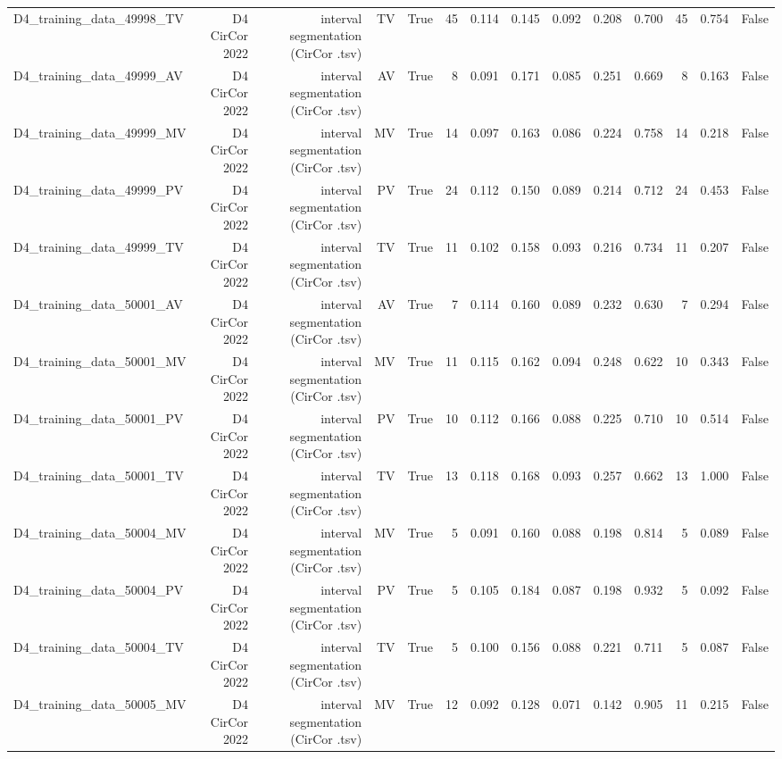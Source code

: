 \begin{table}[htbp]
\begin{tabular}{lrrrrrrrrrrrrr}
    D4\_training\_data\_49998\_TV & D4 CirCor 2022 & interval segmentation (CirCor .tsv) & TV & True & 45 & 0.114 & 0.145 & 0.092 & 0.208 & 0.700 & 45 & 0.754 & False \\
    D4\_training\_data\_49999\_AV & D4 CirCor 2022 & interval segmentation (CirCor .tsv) & AV & True & 8 & 0.091 & 0.171 & 0.085 & 0.251 & 0.669 & 8 & 0.163 & False \\
    D4\_training\_data\_49999\_MV & D4 CirCor 2022 & interval segmentation (CirCor .tsv) & MV & True & 14 & 0.097 & 0.163 & 0.086 & 0.224 & 0.758 & 14 & 0.218 & False \\
    D4\_training\_data\_49999\_PV & D4 CirCor 2022 & interval segmentation (CirCor .tsv) & PV & True & 24 & 0.112 & 0.150 & 0.089 & 0.214 & 0.712 & 24 & 0.453 & False \\
    D4\_training\_data\_49999\_TV & D4 CirCor 2022 & interval segmentation (CirCor .tsv) & TV & True & 11 & 0.102 & 0.158 & 0.093 & 0.216 & 0.734 & 11 & 0.207 & False \\
    D4\_training\_data\_50001\_AV & D4 CirCor 2022 & interval segmentation (CirCor .tsv) & AV & True & 7 & 0.114 & 0.160 & 0.089 & 0.232 & 0.630 & 7 & 0.294 & False \\
    D4\_training\_data\_50001\_MV & D4 CirCor 2022 & interval segmentation (CirCor .tsv) & MV & True & 11 & 0.115 & 0.162 & 0.094 & 0.248 & 0.622 & 10 & 0.343 & False \\
    D4\_training\_data\_50001\_PV & D4 CirCor 2022 & interval segmentation (CirCor .tsv) & PV & True & 10 & 0.112 & 0.166 & 0.088 & 0.225 & 0.710 & 10 & 0.514 & False \\
    D4\_training\_data\_50001\_TV & D4 CirCor 2022 & interval segmentation (CirCor .tsv) & TV & True & 13 & 0.118 & 0.168 & 0.093 & 0.257 & 0.662 & 13 & 1.000 & False \\
    D4\_training\_data\_50004\_MV & D4 CirCor 2022 & interval segmentation (CirCor .tsv) & MV & True & 5 & 0.091 & 0.160 & 0.088 & 0.198 & 0.814 & 5 & 0.089 & False \\
    D4\_training\_data\_50004\_PV & D4 CirCor 2022 & interval segmentation (CirCor .tsv) & PV & True & 5 & 0.105 & 0.184 & 0.087 & 0.198 & 0.932 & 5 & 0.092 & False \\
    D4\_training\_data\_50004\_TV & D4 CirCor 2022 & interval segmentation (CirCor .tsv) & TV & True & 5 & 0.100 & 0.156 & 0.088 & 0.221 & 0.711 & 5 & 0.087 & False \\
    D4\_training\_data\_50005\_MV & D4 CirCor 2022 & interval segmentation (CirCor .tsv) & MV & True & 12 & 0.092 & 0.128 & 0.071 & 0.142 & 0.905 & 11 & 0.215 & False \\

\end{tabular}
\end{table}
